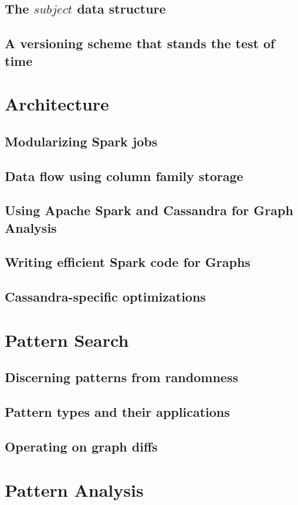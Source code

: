\documentclass[
        a4paper,     %
        titlepage,   %
        twoside,     %
        parskip      %
        ]{scrartcl}  %
\begin{document}
    \subsection{The $subject$ data structure}
    \subsection{A versioning scheme that stands the test of time}
  \section{Architecture}
    \subsection{Modularizing Spark jobs}
    \subsection{Data flow using column family storage}
    \subsection{Using Apache Spark and Cassandra for Graph Analysis}
    \subsection{Writing efficient Spark code for Graphs}
    \subsection{Cassandra-specific optimizations}
  \section{Pattern Search}
    \subsection{Discerning patterns from randomness}
    \subsection{Pattern types and their applications}
    \subsection{Operating on graph diffs}
  \section{Pattern Analysis}
\end{document}
